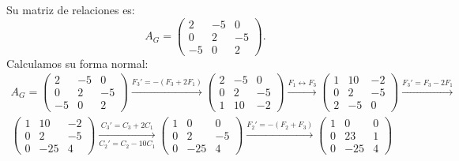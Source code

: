 \begin{ejercicio}
\begin{enumerate}
        Su matriz de relaciones es:
        \begin{equation*}
            A_G = \begin{pmatrix}
                2 & -5 & 0 \\
                0 & 2 & -5 \\
                -5 & 0 & 2
            \end{pmatrix}.
        \end{equation*}
        Calculamos su forma normal:
        \begin{multline*}
            A_G = \begin{pmatrix}
                2 & -5 & 0 \\
                0 & 2 & -5 \\
                -5 & 0 & 2
            \end{pmatrix}
            \xrightarrow{F_3'=-(F_3+2F_1)}
            \begin{pmatrix}
                2 & -5 & 0 \\
                0 & 2 & -5 \\
                1 & 10 & -2
            \end{pmatrix}
            \xrightarrow{F_1\leftrightarrow F_3}
            \begin{pmatrix}
                1 & 10 & -2 \\
                0 & 2 & -5 \\
                2 & -5 & 0
            \end{pmatrix}
            \xrightarrow{F_3'=F_3-2F_1}\\
            \begin{pmatrix}
                1 & 10 & -2 \\
                0 & 2 & -5 \\
                0 & -25 & 4
            \end{pmatrix}
            \xrightarrow[C_2'=C_2-10C_1]{C_3'=C_3+2C_1}
            \begin{pmatrix}
                1 & 0 & 0 \\
                0 & 2 & -5 \\
                0 & -25 & 4
            \end{pmatrix}
            \xrightarrow{F_2'=-(F_2+F_3)}
            \begin{pmatrix}
                1 & 0 & 0 \\
                0 & 23 & 1 \\
                0 & -25 & 4
            \end{pmatrix}

\end{multline*}
\end{enumerate}
\end{ejercicio}
